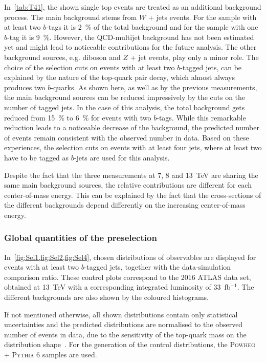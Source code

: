 In~\cref{tab:T41}, the shown single top events are treated as an additional background process.
The main background stems from $W$ + jets events. For the sample with at least two $b$-tags it is  2~\% of the total background and for the sample with one $b$-tag it is 9~\%. However, the QCD-multijet background has not been estimated yet and might lead to noticeable contributions for the future analysis. The other background sources, e.g.  diboson  and $Z$ + jet events, play only a minor role. 
The choice of the selection cuts on events with at least two $b$-tagged jets, can be explained by the nature of the top-quark pair decay, which almost always produces two $b$-quarks.  As shown here, as well as by the previous measurements, the main background sources can be reduced impressively by the cuts on the number of tagged jets. In the  case of this analysis, the total background gets reduced from  15~\% to 6~\% for events with two  $b$-tags. While this remarkable reduction leads to a noticeable decrease of the background, the predicted number of events remain consistent with the observed number in data. Based on these experiences, the selection cuts on events with at least four jets, where at least two have to be tagged as $b$-jets are used for this analysis.

Despite the fact that the three measurements at 7, 8 and 13~TeV are sharing the same main background sources, the relative contributions are different for each center-of-mass energy. This can be explained by the fact that the cross-sections of the different backgrounds depend differently on the increasing center-of-mass energy.


\subsubsection{Global quantities of the preselection}

In~\cref{fig:Sel1,fig:Sel2,fig:Sel4}, chosen distributions of observables are displayed for events with at least two $b$-tagged jets, together with the data-simulation comparison ratio. These control plots correspond to the  2016 ATLAS data set, obtained at 13~TeV with a corresponding integrated luminosity of 33~fb$^{-1}$. The different backgrounds are also shown by the coloured histograms. 

If not mentioned otherwise, all shown distributions contain only statistical uncertainties and the  predicted distributions are normalised to the observed number of events in data, due to the sensitivity of the top-quark mass on the distribution shape~\cite{ATLAS-CONF-2017-071}. For the generation of  the control distributions, the \textsc{Powheg} + \textsc{Pythia 6} samples are used.


